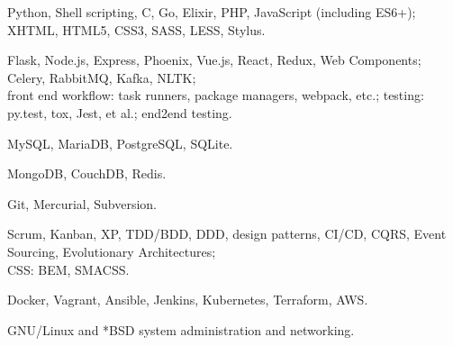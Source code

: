 \documentclass{resume}
\begin{document}
\begin{skillssection}
        {Python, Shell scripting, C, Go, Elixir, PHP, JavaScript (including
            ES6+);\\%
            XHTML, HTML5, CSS3, SASS, LESS, Stylus.}

        {Flask, Node.js, Express, Phoenix, Vue.js, React, Redux, Web
            Components; Celery, RabbitMQ, Kafka, NLTK;\\%
            front end workflow: task runners, package managers, webpack, etc.;
            testing: py.test, tox, Jest, et al.; end2end testing.}

        {MySQL, MariaDB, PostgreSQL, SQLite.}

        {MongoDB, CouchDB, Redis.}

        {Git, Mercurial, Subversion.}

        {Scrum, Kanban, XP, TDD/BDD, DDD, design patterns, CI/CD, CQRS, Event
            Sourcing, Evolutionary Architectures;\\%
            CSS: BEM, SMACSS.}

        {Docker, Vagrant, Ansible, Jenkins, Kubernetes, Terraform, AWS.}

        {GNU/Linux and *BSD system administration and networking.}
\end{skillssection}

\end{document}
